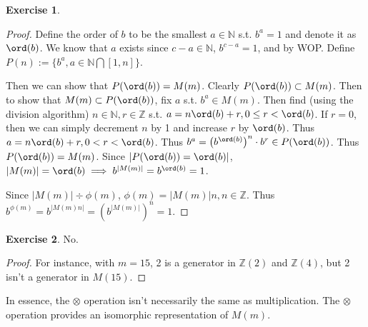 \documentclass[11pt]{article}
\theoremstyle{definition}
\newtheorem{exercise}{{Exercise}}
\newcommand{\Z}{\mathbb{Z}}
\newcommand{\N}{\mathbb{N}}
\begin{document}
\begin{exercise}
\begin{proof}
		Define the order of $b$ to be the smallest $a\in\N$ s.t. $b^a = 1$ and denote it as $\ord(b)$. We know that $a$ exists since $c-a \in\N$, $b^{c-a} = 1$, and by WOP. Define $P(n) := \{b^a, a\in \N \bigcap [1, n]\}$. 
		
		Then we can show that $P(\ord(b)) = M(m)$. Clearly $P(\ord(b)) \subset M(m)$. Then to show that $M(m) \subset P(\ord(b))$, fix $a$ s.t. $b^a \in M(m)$. Then find (using the division algorithm) $n \in \N, r\in\Z$ s.t. $a = n\ord(b) + r, 0 \le r < \ord(b)$. If $r=0$, then we can simply decrement $n$ by 1 and increase $r$ by $\ord(b)$. Thus $a = n\ord(b) + r, 0<r<\ord(b)$. Thus $b^a = \left(b^{\ord(b)}\right)^n \cdot b^r \in P(\ord(b))$. Thus $P(\ord(b)) = M(m)$. Since $|P(\ord(b)) = \ord(b)|$, $|M(m)| = \ord(b) \implies b^{|M(m)|} = b^{\ord(b)} = 1$.

		Since $|M(m)| \div \phi(m)$, $\phi(m) = |M(m)|n, n\in\Z$. Thus $b^{\phi(m)} = b^{|M(m)n|} = \left(b^{|M(m)|}\right)^n = 1$.
		
		
	\end{proof}
\end{exercise}

\begin{exercise}
	No.
	\begin{proof}
	 For instance, with $m=15$, 2 is a generator in $\Z(2)$ and $\Z(4)$, but 2 isn't a generator in $M(15)$.
	\end{proof}
	In essence, the $\otimes$ operation isn't necessarily the same as multiplication. The $\otimes$ operation provides an isomorphic representation of $M(m)$.
\end{exercise}
\end{document}
